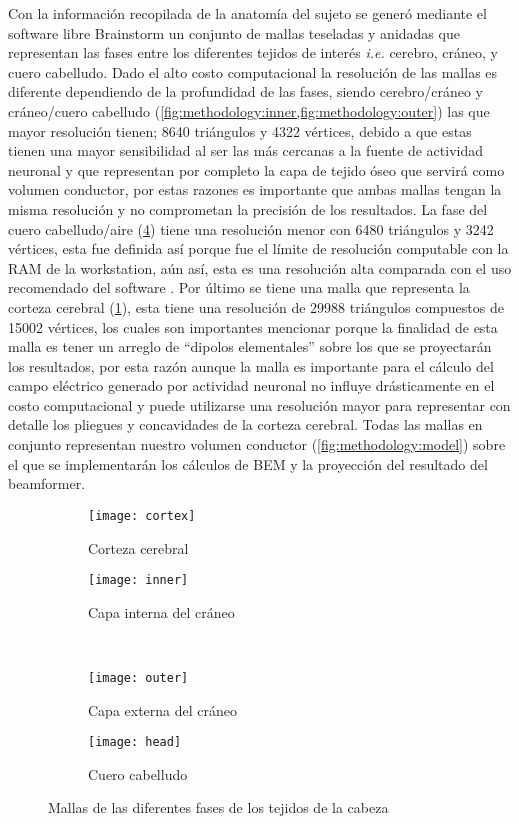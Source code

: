 Con la información recopilada de la anatomía del sujeto se generó mediante el software libre Brainstorm\cite{brain2011} un conjunto de mallas teseladas y anidadas que representan las fases entre los diferentes tejidos de interés \emph{i.e.} cerebro, cráneo, y cuero cabelludo. Dado el alto costo computacional la resolución de las mallas es diferente dependiendo de la profundidad de las fases, siendo cerebro/cráneo y cráneo/cuero cabelludo (\cref{fig:methodology:inner,fig:methodology:outer}) las que mayor resolución tienen; 8640 triángulos y 4322 vértices, debido a que estas tienen una mayor sensibilidad al ser las más cercanas a la fuente de actividad neuronal y que representan por completo la capa de tejido óseo que servirá como volumen conductor, por estas razones es importante que ambas mallas tengan la misma resolución y no comprometan la precisión de los resultados. La fase del cuero cabelludo/aire (\cref{fig:methodology:head}) tiene una resolución menor con 6480 triángulos y 3242 vértices, esta fue definida así porque fue el límite de resolución computable con la RAM de la workstation, aún así, esta es una resolución alta comparada con el uso recomendado del software \cite{Tadel2019}. Por último se tiene una malla que representa la corteza cerebral (\cref{fig:methodology:cortex}), esta tiene una resolución de 29988 triángulos compuestos de 15002 vértices, los cuales son importantes mencionar porque la finalidad de esta malla es tener un arreglo de ``dipolos elementales'' sobre los que se proyectarán los resultados, por esta razón aunque la malla es importante para el cálculo del campo eléctrico generado por actividad neuronal no influye drásticamente en el costo computacional y puede utilizarse una resolución mayor para representar con detalle los pliegues y concavidades de la corteza cerebral. Todas las mallas en conjunto representan nuestro volumen conductor (\cref{fig:methodology:model}) sobre el que se implementarán los cálculos de BEM y la proyección del resultado del beamformer.

\begin{figure}[htb]
	\centering
	\begin{subfigure}{0.45\textwidth}
		\texttt{[image: cortex]}
		\caption{Corteza cerebral}
		\label{fig:methodology:cortex}
	\end{subfigure}\hfill
	\begin{subfigure}{0.45\textwidth}
		\texttt{[image: inner]}
		\caption{Capa interna del cráneo}
		\label{fig:methodology:inner}
	\end{subfigure}\\
	\begin{subfigure}{0.45\textwidth}
		\texttt{[image: outer]}
		\caption{Capa externa del cráneo}
		\label{fig:methodology:outer}
	\end{subfigure}\hfill
	\begin{subfigure}{0.45\textwidth}
		\texttt{[image: head]}
		\caption{Cuero cabelludo}
		\label{fig:methodology:head}
	\end{subfigure}
	\caption{Mallas de las diferentes fases de los tejidos de la cabeza}
	\label{fig:methodology:meshes}
\end{figure}



